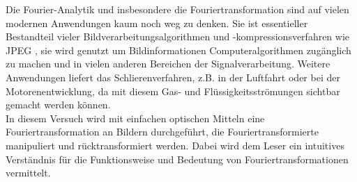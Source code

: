 
Die Fourier-Analytik und insbesondere die Fouriertransformation sind auf vielen modernen Anwendungen kaum noch weg zu denken. Sie ist essentieller Bestandteil vieler Bildverarbeitungsalgorithmen \cite{easton_fourier_2010} und -kompressionsverfahren wie JPEG \cite{_jpeg_2015}, sie wird genutzt um Bildinformationen Computeralgorithmen zugänglich zu machen \cite{prof._dr._norbert_link_vorlesungsscript:_????} und in vielen anderen Bereichen der Signalverarbeitung. Weitere Anwendungen liefert das Schlierenverfahren, z.B. in der Luftfahrt oder bei der Motorenentwicklung, da mit diesem Gas- und Flüssigkeitsströmungen sichtbar gemacht werden können.\\

In diesem Versuch wird mit einfachen optischen Mitteln eine Fouriertransformation an Bildern durchgeführt, die Fouriertransformierte manipuliert und rücktransformiert werden. Dabei wird dem Leser ein intuitives Verständnis für die Funktionsweise und Bedeutung von Fouriertransformationen vermittelt.